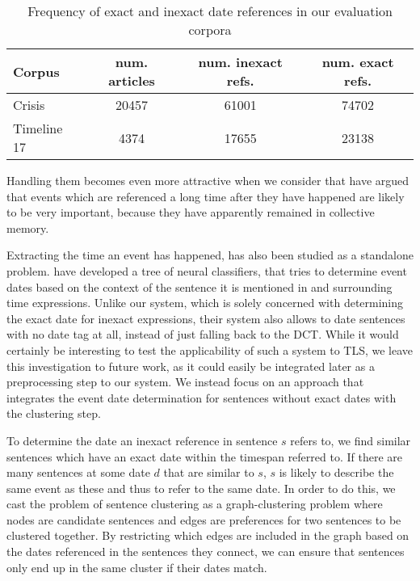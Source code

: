 \documentclass[a4paper,BCOR=10mm]{report}
\numberwithin{lemma}{chapter}
\numberwithin{definition}{chapter}
\begin{document}
\begin{table}
\begin{center}
\begin{tabular}{|l|c|c|c|}
\hline
\textbf{Corpus} & \textbf{num. articles} & \textbf{num. inexact refs.} & \textbf{num. exact refs.} \\\hline
Crisis & 20457 & 61001 & 74702 \\
Timeline 17 & 4374 & 17655 & 23138 \\\hline
\end{tabular}
\caption{Frequency of exact and inexact date references in our evaluation corpora}
\label{tab:ambigous-date-ref}
\end{center}
\end{table}


Handling them becomes even more attractive when we consider that \citet{datesel-graph} have argued that events which are referenced a long time after they have happened are likely to be very important, because they have apparently remained in collective memory. %

Extracting the time an event has happened, has also been studied as a standalone problem. \citet{event-time-extraction} have developed a tree of neural classifiers, that tries to determine event dates based on the context of the sentence it is mentioned in and surrounding time expressions. Unlike our system, which is solely concerned with determining the exact date for inexact expressions, their system also allows to date sentences with no date tag at all, instead of just falling back to the DCT.
While it would certainly be interesting to test the applicability of such a system to TLS, we leave this investigation to future work, as it could easily be integrated later as a preprocessing step to our system.
We instead focus on an approach that integrates the event date determination for sentences without exact dates with the clustering step.

To determine the date an inexact reference in sentence $s$ refers to, we find similar sentences which have an exact date within the timespan referred to. If there are many sentences at some date $d$ that are similar to $s$, $s$ is likely to describe the same event as these and thus to refer to the same date. In order to do this, we cast the problem of sentence clustering as a graph-clustering problem where nodes are candidate sentences and edges are preferences for two sentences to be clustered together. By restricting which edges are included in the graph based on the dates referenced in the sentences they connect, we can ensure that sentences only end up in the same cluster if their dates match.
\end{document}
